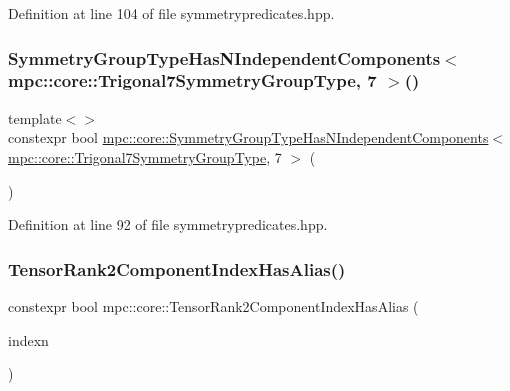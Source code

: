 Definition at line 104 of file symmetrypredicates.\+hpp.

\mbox{\label{namespacempc_1_1core_a9d9122afa0af51479a4dec2d2d8c68a6}} 
\subsubsection{\texorpdfstring{Symmetry\+Group\+Type\+Has\+N\+Independent\+Components$<$ mpc\+::core\+::\+Trigonal7\+Symmetry\+Group\+Type, 7 $>$()}{SymmetryGroupTypeHasNIndependentComponents< mpc::core::Trigonal7SymmetryGroupType, 7 >()}}
{\footnotesize\ttfamily template$<$$>$ \\
constexpr bool \mbox{\hyperlink{namespacempc_1_1core_a4fc1927e7fe7eb577a6bef4ab6bfb4e4}{mpc\+::core\+::\+Symmetry\+Group\+Type\+Has\+N\+Independent\+Components}}$<$ \mbox{\hyperlink{structmpc_1_1core_1_1_trigonal7_symmetry_group_type}{mpc\+::core\+::\+Trigonal7\+Symmetry\+Group\+Type}}, 7 $>$ (\begin{DoxyParamCaption}{ }\end{DoxyParamCaption})\hspace{0.3cm}{\ttfamily [inline]}}



Definition at line 92 of file symmetrypredicates.\+hpp.

\mbox{\label{namespacempc_1_1core_a1773ac71ac76281f15a14fbc2590c4da}} 
\subsubsection{\texorpdfstring{Tensor\+Rank2\+Component\+Index\+Has\+Alias()}{TensorRank2ComponentIndexHasAlias()}}
{\footnotesize\ttfamily constexpr bool mpc\+::core\+::\+Tensor\+Rank2\+Component\+Index\+Has\+Alias (\begin{DoxyParamCaption}\item[{const \mbox{\hyperlink{namespacempc_1_1core_a7ae080dac58868c1e167479dce34928a}{mpc\+::core\+::\+Tensor\+Rank2\+Component\+Index}} \&}]{indexn }\end{DoxyParamCaption})\hspace{0.3cm}{\ttfamily [inline]}}



